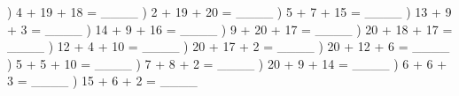 \documentclass{article}%
\begin{document}
\newline%
) 4 + 19 + 18 = \_\_\_\_%
\newline%
\newline%
) 2 + 19 + 20 = \_\_\_\_%
\newline%
\newline%
) 5 + 7 + 15 = \_\_\_\_%
\newline%
\newline%
) 13 + 9 + 3 = \_\_\_\_%
\newline%
\newline%
) 14 + 9 + 16 = \_\_\_\_%
\newline%
\newline%
) 9 + 20 + 17 = \_\_\_\_%
\newline%
\newline%
) 20 + 18 + 17 = \_\_\_\_%
\newline%
\newline%
) 12 + 4 + 10 = \_\_\_\_%
\newline%
\newline%
) 20 + 17 + 2 = \_\_\_\_%
\newline%
\newline%
) 20 + 12 + 6 = \_\_\_\_%
\newline%
\newline%
) 5 + 5 + 10 = \_\_\_\_%
\newline%
\newline%
) 7 + 8 + 2 = \_\_\_\_%
\newline%
\newline%
) 20 + 9 + 14 = \_\_\_\_%
\newline%
\newline%
) 6 + 6 + 3 = \_\_\_\_%
\newline%
\newline%
) 15 + 6 + 2 = \_\_\_\_%
\end{document}
